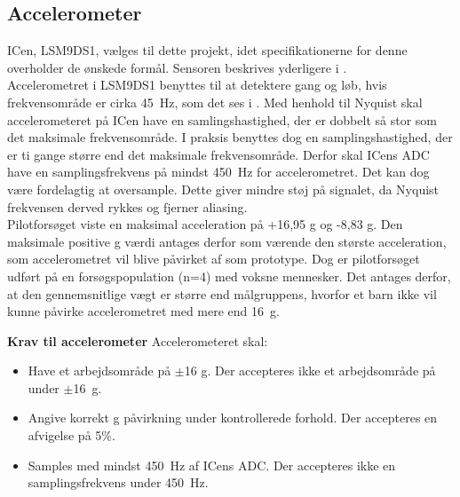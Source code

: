 \subsection{Accelerometer}\label{krav:acc}
ICen, LSM9DS1, vælges til dette projekt, idet specifikationerne for denne overholder de ønskede formål. Sensoren beskrives yderligere i . \\
Accelerometret i LSM9DS1 benyttes til at detektere gang og løb, hvis frekvensområde er cirka 45~Hz, som det ses i . Med henhold til Nyquist skal accelerometeret på ICen have en samlingshastighed, der er dobbelt så stor som det maksimale frekvensområde. %
I praksis benyttes dog en samplingshastighed, der er ti gange større end det maksimale frekvensområde. Derfor skal ICens ADC have en samplingsfrekvens på mindst 450~Hz for accelerometret. Det kan dog være fordelagtig at oversample. Dette giver mindre støj på signalet, da Nyquist frekvensen derved rykkes og fjerner aliasing. \citep{Webster2011} \\
Pilotforsøget viste en maksimal acceleration på +16,95 g og -8,83 g. Den maksimale positive g værdi antages derfor som værende den største acceleration, som accelerometret vil blive påvirket af som prototype. Dog er pilotforsøget udført på en forsøgspopulation (n=4) med voksne mennesker. Det antages derfor, at den gennemsnitlige vægt er større end målgruppens, hvorfor et barn ikke vil kunne påvirke accelerometret med mere end 16~g. 

\textbf{Krav til accelerometer} \newline 
Accelerometeret skal:
\begin{itemize}
\item Have et arbejdsområde på $\pm$16 g. Der accepteres ikke et arbejdsområde på under $\pm$16~g.
\item Angive korrekt g påvirkning under kontrollerede forhold. Der accepteres en afvigelse på 5\%.
\item Samples med mindst 450~Hz af ICens ADC. Der accepteres ikke en samplingsfrekvens under 450~Hz.
\end{itemize}

